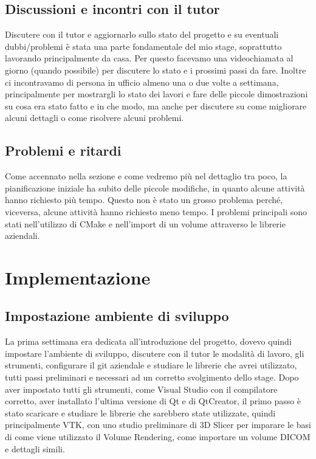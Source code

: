 \subsection{Discussioni e incontri con il tutor}
Discutere con il tutor e aggiornarlo sullo stato del progetto e su eventuali dubbi/problemi è stata una parte fondamentale del mio stage, soprattutto lavorando principalmente da casa. Per questo facevamo una videochiamata al giorno (quando possibile) per discutere lo stato e i prossimi passi da fare. Inoltre ci incontravamo di persona in ufficio almeno una o due volte a settimana, principalmente per mostrargli lo stato dei lavori e fare delle piccole dimostrazioni su cosa era stato fatto e in che modo, ma anche per discutere su come migliorare alcuni dettagli o come risolvere alcuni problemi.

\subsection{Problemi e ritardi}
Come accennato nella sezione  e come vedremo più nel dettaglio tra poco, la pianificazione iniziale ha subito delle piccole modifiche, in quanto alcune attività hanno richiesto più tempo. Questo non è stato un grosso problema perché, viceversa, alcune attività hanno richiesto meno tempo. I problemi principali sono stati nell'utilizzo di CMake e nell'import di un volume attraverso le librerie aziendali.

\section{Implementazione}
\subsection{Impostazione ambiente di sviluppo}
La prima settimana era dedicata all'introduzione del progetto, dovevo quindi impostare l'ambiente di sviluppo, discutere con il tutor le modalità di lavoro, gli strumenti, configurare il git aziendale e studiare le librerie che avrei utilizzato, tutti passi preliminari e necessari ad un corretto svolgimento dello stage.
Dopo aver impostato tutti gli strumenti, come Visual Studio con il compilatore corretto, aver installato l'ultima versione di Qt e di QtCreator, il primo passo è stato scaricare e studiare le librerie che sarebbero state utilizzate, quindi principalmente VTK, con uno studio preliminare di 3D Slicer per imparare le basi di come viene utilizzato il Volume Rendering, come importare un volume DICOM e dettagli simili. 

